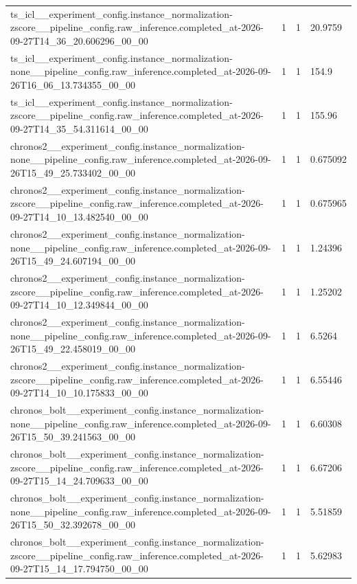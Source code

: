 \begin{tabular}{llll}
ts\_icl\_\_experiment\_config.instance\_normalization-zscore\_\_pipeline\_config.raw\_inference.completed\_at-2026-09-27T14\_36\_20.606296\_00\_00 & 1 & 1 & 20.9759 \\
ts\_icl\_\_experiment\_config.instance\_normalization-none\_\_pipeline\_config.raw\_inference.completed\_at-2026-09-26T16\_06\_13.734355\_00\_00 & 1 & 1 & 154.9 \\
ts\_icl\_\_experiment\_config.instance\_normalization-zscore\_\_pipeline\_config.raw\_inference.completed\_at-2026-09-27T14\_35\_54.311614\_00\_00 & 1 & 1 & 155.96 \\
chronos2\_\_experiment\_config.instance\_normalization-none\_\_pipeline\_config.raw\_inference.completed\_at-2026-09-26T15\_49\_25.733402\_00\_00 & 1 & 1 & 0.675092 \\
chronos2\_\_experiment\_config.instance\_normalization-zscore\_\_pipeline\_config.raw\_inference.completed\_at-2026-09-27T14\_10\_13.482540\_00\_00 & 1 & 1 & 0.675965 \\
chronos2\_\_experiment\_config.instance\_normalization-none\_\_pipeline\_config.raw\_inference.completed\_at-2026-09-26T15\_49\_24.607194\_00\_00 & 1 & 1 & 1.24396 \\
chronos2\_\_experiment\_config.instance\_normalization-zscore\_\_pipeline\_config.raw\_inference.completed\_at-2026-09-27T14\_10\_12.349844\_00\_00 & 1 & 1 & 1.25202 \\
chronos2\_\_experiment\_config.instance\_normalization-none\_\_pipeline\_config.raw\_inference.completed\_at-2026-09-26T15\_49\_22.458019\_00\_00 & 1 & 1 & 6.5264 \\
chronos2\_\_experiment\_config.instance\_normalization-zscore\_\_pipeline\_config.raw\_inference.completed\_at-2026-09-27T14\_10\_10.175833\_00\_00 & 1 & 1 & 6.55446 \\
chronos\_bolt\_\_experiment\_config.instance\_normalization-none\_\_pipeline\_config.raw\_inference.completed\_at-2026-09-26T15\_50\_39.241563\_00\_00 & 1 & 1 & 6.60308 \\
chronos\_bolt\_\_experiment\_config.instance\_normalization-zscore\_\_pipeline\_config.raw\_inference.completed\_at-2026-09-27T15\_14\_24.709633\_00\_00 & 1 & 1 & 6.67206 \\
chronos\_bolt\_\_experiment\_config.instance\_normalization-none\_\_pipeline\_config.raw\_inference.completed\_at-2026-09-26T15\_50\_32.392678\_00\_00 & 1 & 1 & 5.51859 \\
chronos\_bolt\_\_experiment\_config.instance\_normalization-zscore\_\_pipeline\_config.raw\_inference.completed\_at-2026-09-27T15\_14\_17.794750\_00\_00 & 1 & 1 & 5.62983 \\

\end{tabular}
